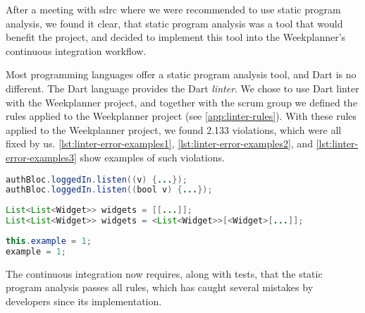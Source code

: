 After a meeting with \gls{sdrc} where we were recommended to use static program analysis, we found it clear, that static program analysis was a tool that would benefit the project, and decided to implement this tool into the Weekplanner's continuous integration workflow.

Most programming languages offer a static program analysis tool, and Dart is no different. The Dart language provides the Dart \textit{linter}\cite{dart_linter_2019}. We chose to use Dart linter with the Weekplanner project, and together with the scrum group we defined the rules applied to the Weekplanner project (see \autoref{app:linter-rules}). With these rules applied to the Weekplanner project, we found 2.133 violations, which were all fixed by us. \autoref{lst:linter-error-examples1}, \autoref{lst:linter-error-examples2}, and \autoref{lst:linter-error-examples3} show examples of such violations.

\begin{lstlisting}[label={lst:linter-error-examples1},caption={Missing type for parameter},language=java]
authBloc.loggedIn.listen((v) {...});
authBloc.loggedIn.listen((bool v) {...});
\end{lstlisting}

\begin{lstlisting}[label={lst:linter-error-examples2},caption={Missing type for array and array elements},language=java]
List<List<Widget>> widgets = [[...]];
List<List<Widget>> widgets = <List<Widget>>[<Widget>[...]];
\end{lstlisting}

\begin{lstlisting}[label={lst:linter-error-examples3},caption={Avoid using \textit{this} keyword if not necessary},language=java]
this.example = 1;
example = 1;
\end{lstlisting}


The continuous integration now requires, along with tests, that the static program analysis passes all rules, which has caught several mistakes by developers since its implementation.
